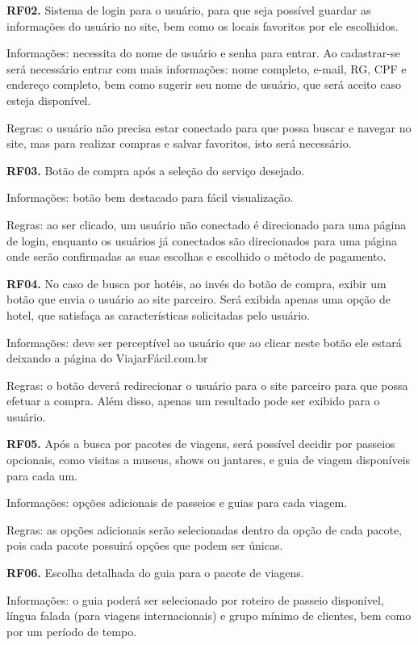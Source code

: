 \documentclass[12pt]{article}
\begin{document}
\bigskip
{\bf RF02.} Sistema de login para o usuário, para que seja possível guardar as informações do usuário no site, bem como os locais favoritos por ele escolhidos.

Informações: necessita do nome de usuário e senha para entrar. Ao cadastrar-se será necessário entrar com mais informações: nome completo, e-mail,  RG, CPF e endereço completo, bem como sugerir seu nome de usuário, que será aceito caso esteja disponível.

Regras: o usuário não precisa estar conectado para que possa buscar e navegar no site, mas para realizar compras e salvar favoritos, isto será necessário.

\bigskip
{\bf RF03.} Botão de compra após a seleção do serviço desejado.

Informações: botão bem destacado para fácil visualização.

Regras: ao ser clicado, um usuário não conectado é direcionado para uma página de login, enquanto os usuários já conectados são direcionados para uma página onde serão confirmadas as suas escolhas e escolhido o método de pagamento.

\bigskip
{\bf RF04.} No caso de busca por hotéis, ao invés do botão de compra, exibir um botão que envia o usuário ao site parceiro. Será exibida apenas uma opção de hotel, que satisfaça as características solicitadas pelo usuário.

Informações: deve ser perceptível ao usuário que ao clicar neste botão ele estará deixando a página do ViajarFácil.com.br

Regras: o botão deverá redirecionar o usuário para o site parceiro para que possa efetuar a compra. Além disso, apenas um resultado pode ser exibido para o usuário.

\bigskip
{\bf RF05.} Após a busca por pacotes de viagens, será possível decidir por passeios opcionais, como visitas a museus, shows ou jantares, e guia de viagem disponíveis para cada um.

Informações: opções adicionais de passeios e guias para cada viagem.

Regras: as opções adicionais serão selecionadas dentro da opção de cada pacote, pois cada pacote possuirá opções que podem ser únicas.

\bigskip
{\bf RF06.} Escolha detalhada do guia para o pacote de viagens.

Informações: o guia poderá ser selecionado por roteiro de passeio disponível, língua falada (para viagens internacionais) e grupo mínimo de clientes, bem como por um período de tempo.
\end{document}

